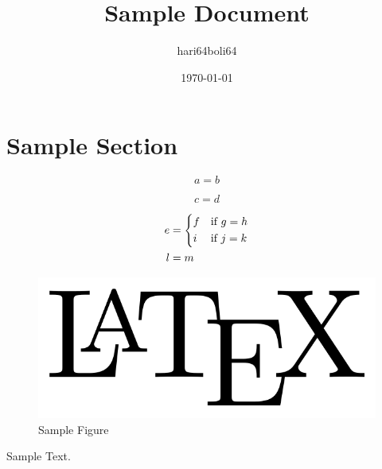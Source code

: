 \documentclass[a4paper, 10pt]{article}
\begin{document}
\title{Sample Document}
\author{hari64boli64}
\date{\today}
\maketitle

\section{Sample Section}

\begin{equation}\label{eq:1}
    a = b
\end{equation}

\begin{equation*}
    c = d
\end{equation*}

\begin{align}
    e & = \begin{dcases}
              f & \text{if } g = h \\
              i & \text{if } j = k
          \end{dcases} \\
    l & = m \notag
\end{align}

\begin{figure}[h] %
    \centering
    \includegraphics[width=0.5\columnwidth]{sample.png}
    \caption{Sample Figure}
    \label{fig:1}
\end{figure}

Sample Text.
\end{document}
